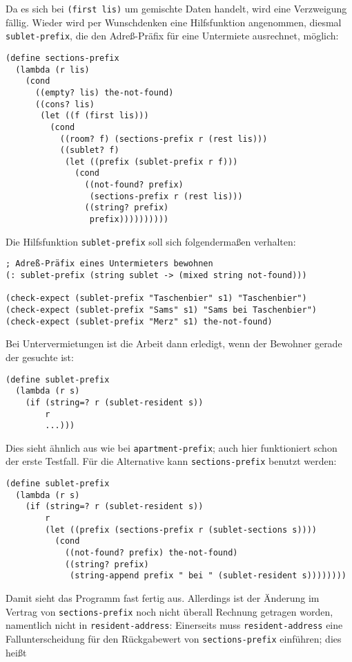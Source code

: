 %
Da es sich bei \texttt{(first lis)} um gemischte Daten handelt, wird
eine Verzweigung fällig.  Wieder wird per Wunschdenken eine
Hilfsfunktion angenommen, diesmal \texttt{sublet-prefix}, die den
Adreß-Präfix für eine Untermiete ausrechnet, möglich:
%
\begin{verbatim}
(define sections-prefix
  (lambda (r lis)
    (cond
      ((empty? lis) the-not-found)
      ((cons? lis)
       (let ((f (first lis)))
         (cond
           ((room? f) (sections-prefix r (rest lis)))
           ((sublet? f)
            (let ((prefix (sublet-prefix r f)))
              (cond
                ((not-found? prefix)
                 (sections-prefix r (rest lis)))
                ((string? prefix)
                 prefix))))))))))
\end{verbatim}
%
Die Hilfsfunktion \texttt{sublet-prefix} soll sich folgendermaßen verhalten:
%
\begin{verbatim}
; Adreß-Präfix eines Untermieters bewohnen
(: sublet-prefix (string sublet -> (mixed string not-found)))

(check-expect (sublet-prefix "Taschenbier" s1) "Taschenbier")
(check-expect (sublet-prefix "Sams" s1) "Sams bei Taschenbier")
(check-expect (sublet-prefix "Merz" s1) the-not-found)
\end{verbatim}
%
Bei Untervermietungen ist die Arbeit dann erledigt, wenn der Bewohner
gerade der gesuchte ist:
%
\begin{verbatim}
(define sublet-prefix
  (lambda (r s)
    (if (string=? r (sublet-resident s))
        r
        ...)))
\end{verbatim}
%
Dies sieht ähnlich aus wie bei \texttt{apartment-prefix}; auch hier
funktioniert schon der erste Testfall.  Für die Alternative kann
\texttt{sections-prefix} benutzt werden:
%
\begin{verbatim}
(define sublet-prefix
  (lambda (r s)
    (if (string=? r (sublet-resident s))
        r
        (let ((prefix (sections-prefix r (sublet-sections s))))
          (cond
            ((not-found? prefix) the-not-found)
            ((string? prefix)
             (string-append prefix " bei " (sublet-resident s))))))))
\end{verbatim}
%
Damit sieht das Programm fast fertig aus. Allerdings ist der Änderung
im Vertrag von \texttt{sections-prefix} noch nicht überall Rechnung
getragen worden, namentlich nicht in \texttt{resident-address}:
Einerseits muss \texttt{resident-address} eine Fallunterscheidung für
den Rückgabewert von \texttt{sections-prefix} einführen; dies heißt
